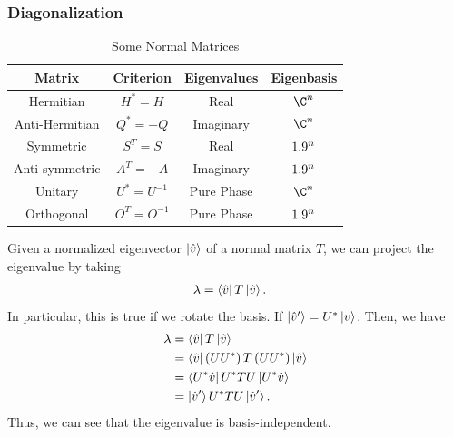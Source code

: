 \documentclass[10pt]{mypackage}
\begin{document}
\subsubsection{Diagonalization}%
\begin{table}
  \centering
  \renewcommand{\arraystretch}{1.5}
  \begin{tabular}{cc|cc}
    Matrix & Criterion & Eigenvalues & Eigenbasis\\
    \hline\hline
    Hermitian & $H^{\ast} = H$ & Real & $\C^n$\\
    Anti-Hermitian & $Q^{\ast} = -Q$ & Imaginary & $\C^n$\\
    Symmetric & $S^{T} = S$ & Real & $1.9^n$\\
    Anti-symmetric & $A^{T} = -A$ & Imaginary & $1.9^n$\\
    Unitary & $U^{\ast} = U^{-1}$ & Pure Phase & $\C^n$\\
    Orthogonal & $O^{T} = O^{-1}$ & Pure Phase & $1.9^n$
  \end{tabular}
  \caption{Some Normal Matrices}
\end{table}
Given a normalized eigenvector $\ket{\hat{v}}$ of a normal matrix $T$, we can project the eigenvalue by taking
\begin{align*}
  \lambda &= \bra{\hat{v}}T\ket{\hat{v}}.
\end{align*}
In particular, this is true if we rotate the basis. If $\ket{\hat{v}'} = U^{\ast}\ket{v}$. Then, we have
\begin{align*}
  \lambda &= \bra{\hat{v}}T \ket{\hat{v}}\\
          &= \bra{\hat{v}}\left(UU^{\ast}\right)T \left(UU^{\ast}\right)\ket{\hat{v}}\\
          &= \bra{U^{\ast}\hat{v}}U^{\ast} T U\ket{U^{\ast}\hat{v}}\\
          &= \ket{\hat{v}'}U^{\ast}TU\ket{\hat{v}'}.
\end{align*}
Thus, we can see that the eigenvalue is basis-independent.\newline
\end{document}
